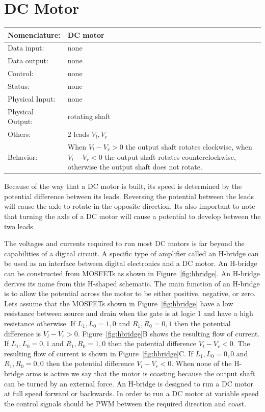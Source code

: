 \section{DC Motor}
\label{page:dvmotor}
\begin{tabular}{|l|p{3.5in}|} \hline
Nomenclature:  & DC motor  \\ \hline
Data input:    & none    \\ \hline
Data output:   & none     \\ \hline
Control:       & none     \\ \hline
Status:        & none      \\ \hline
Physical Input:& none		\\ \hline
Physical Output:& rotating shaft		\\ \hline
Others:        & 2 leads $V_l, V_r$      \\ \hline
Behavior:      & When $V_l-V_r > 0$ the output shaft rotates clockwise, 
when $V_l-V_r < 0$ the output shaft rotates counterclockwise, otherwise the
output shaft does not rotate. \\ \hline
\end{tabular}

Because of the way that a DC motor is built, its speed is determined
by the potential difference between its leads.  Reversing the
potential between the leads will cause the axle to rotate 
in the opposite direction.  Its also
important to note that turning the axle of a DC motor will
cause a potential to develop between the two leads.

The voltages and currents required to run most DC motors is
far beyond the capabilities of a digital circuit.  A specific 
type of amplifier called an H-bridge can be used as an interface 
between digital electronics and a DC motor.  An H-bridge can be
constructed from MOSFETs as shown in 
Figure~\ref{fig:hbridge}.  An H-bridge derives its name from
this  H-shaped schematic.  The main function of an H-bridge is 
to allow the potential across the motor to be either positive,
negative, or zero.  Lets assume that the MOSFETs shown in 
Figure~\ref{fig:hbridge} have a low resistance between source and
drain when the gate is at logic 1 and have a high resistance 
otherwise.  If $L_1,L_0 = 1,0$ and $R_1,R_0 = 0,1$ then the
potential difference is $V_l - V_r > 0$.
Figure~\ref{fig:hbridge}B shows the resulting flow of current.
If $L_1,L_0 = 0,1$ and $R_1,R_0 = 1,0$ then the
potential difference $V_l - V_r < 0$.  The resulting flow of
current is shown in Figure~\ref{fig:hbridge}C.
If $L_1,L_0 = 0,0$ and $R_1,R_0 = 0,0$ then the potential difference 
$V_l - V_r < 0$. When none of the H-bridge arms is active we say that
the motor is coasting because the output shaft 
can be turned by an external force.  An H-bridge is designed 
to run a DC motor at full speed forward or backwards.  In order 
to run a DC motor at variable speed the control signals should be PWM 
between the required direction and coast.

